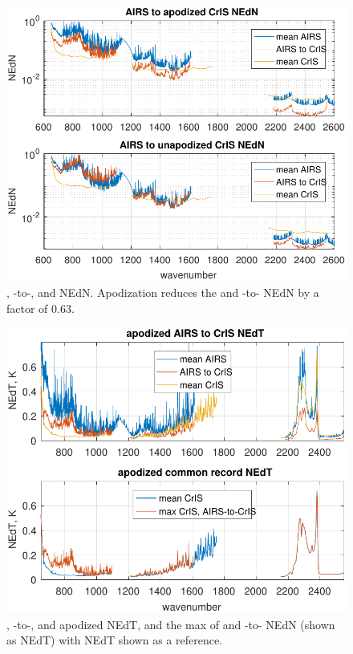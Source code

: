 \documentclass[10pt,twocolumn]{article}
\begin{document}

\begin{figure} %
  \centering
  \includegraphics[width=\linewidth]{figures/a2cris_nedn.pdf}
  \caption{{\airs}, {\airs}-to-{\cris}, and {\cris} NEdN.
    Apodization reduces the {\cris} and {\airs}-to-{\cris} NEdN by a
    factor of $0.63$.}
  \label{nedn}
\end{figure}

\begin{figure} %
  \centering
  \includegraphics[width=\linewidth]{figures/a2cris_nedt.pdf}
  \caption{{\airs}, {\airs}-to-{\cris}, and {\cris} apodized NEdT,
    and the max of {\cris} and {\airs}-to-{\cris} NEdN (shown as
    NEdT) with {\cris} NEdT shown as a reference.}
  \label{nedt}
\end{figure}
\end{document}
